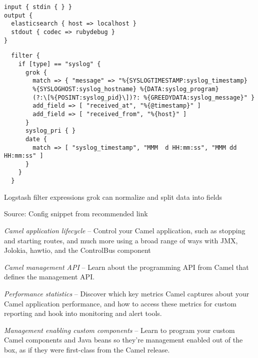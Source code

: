 \documentclass[Screen16to9,17pt]{foils}
\begin{document}
\begin{verbatim}
input { stdin { } }
output {
  elasticsearch { host => localhost }
  stdout { codec => rubydebug }
}
\end{verbatim}



{\footnotesize
\begin{verbatim}
  filter {
    if [type] == "syslog" {
      grok {
        match => { "message" => "%{SYSLOGTIMESTAMP:syslog_timestamp}
        %{SYSLOGHOST:syslog_hostname} %{DATA:syslog_program}
        (?:\[%{POSINT:syslog_pid}\])?: %{GREEDYDATA:syslog_message}" }
        add_field => [ "received_at", "%{@timestamp}" ]
        add_field => [ "received_from", "%{host}" ]
      }
      syslog_pri { }
      date {
        match => [ "syslog_timestamp", "MMM  d HH:mm:ss", "MMM dd HH:mm:ss" ]
      }
    }
  }
\end{verbatim}
}

\begin{list2}
\item Logstash filter expressions grok can normalize and split data into fields
\end{list2}

Source:
Config snippet from recommended link\\
{\small{}}



\begin{list2}
\item \emph{Camel application lifecycle} -- Control your Camel application, such as stopping and
starting routes, and much more using a broad range of ways with JMX, Jolokia,
hawtio, and the ControlBus component
\item \emph{Camel management API} -- Learn about the programming API from Camel that
defines the management API.
\item \emph{Performance statistics} -- Discover which key metrics Camel captures about your
Camel application performance, and how to access these metrics for custom
reporting and hook into monitoring and alert tools.
\item \emph{Management enabling custom components} -- Learn to program your custom Camel
components and Java beans so they’re management enabled out of the box, as if
they were first-­class from the Camel release.
\end{list2}
\end{document}

